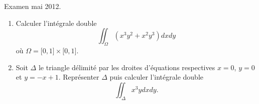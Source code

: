 
\begin{exercice}\label{exoOutilsMath-0144} Examen mai 2012.\\

    \begin{enumerate}
        \item
            Calculer l'intégrale double
            \begin{equation}
                \iint_{\Omega}(x^3y^2+x^2y^3)dxdy
            \end{equation}
            où \( \Omega=\mathopen[ 0 , 1 \mathclose]\times \mathopen[ 0 , 1 \mathclose]\).
        \item
            Soit \( \Delta\) le triangle délimité par les droites d'équations respectives \( x=0\), \( y=0\) et \( y=-x+1\). Représenter \( \Delta\) puis calculer l'intégrale double
            \begin{equation}
                \iint_{\Delta}x^3ydxdy.
            \end{equation}
            
    \end{enumerate}
    

\end{exercice}
